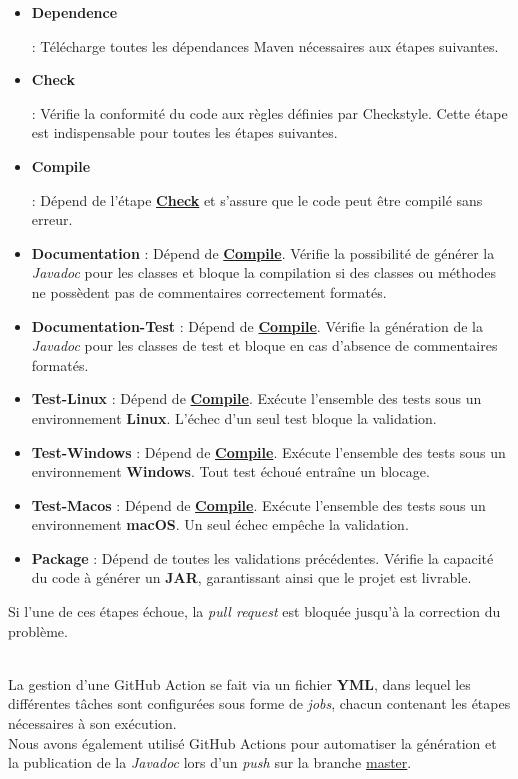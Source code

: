 \begin{itemize}
    \item \hypertarget{DependenceAction}{\textbf{Dependence}} : Télécharge toutes les dépendances Maven nécessaires aux étapes suivantes.
    \item \hypertarget{CheckAction}{\textbf{Check}} : Vérifie la conformité du code aux règles définies par Checkstyle. Cette étape est indispensable pour toutes les étapes suivantes.
    \item \hypertarget{CompileAction}{\textbf{Compile}} : Dépend de l'étape \hyperlink{CheckAction}{\textbf{Check}} et s'assure que le code peut être compilé sans erreur.
    \item \textbf{Documentation} : Dépend de \hyperlink{CompileAction}{\textbf{Compile}}. Vérifie la possibilité de générer la \emph{Javadoc} pour les classes et bloque la compilation si des classes ou méthodes ne possèdent pas de commentaires correctement formatés.
    \item \textbf{Documentation-Test} : Dépend de \hyperlink{CompileAction}{\textbf{Compile}}. Vérifie la génération de la \emph{Javadoc} pour les classes de test et bloque en cas d'absence de commentaires formatés.
    \item \textbf{Test-Linux} : Dépend de \hyperlink{CompileAction}{\textbf{Compile}}. Exécute l’ensemble des tests sous un environnement \textbf{Linux}. L'échec d’un seul test bloque la validation.
    \item \textbf{Test-Windows} : Dépend de \hyperlink{CompileAction}{\textbf{Compile}}. Exécute l’ensemble des tests sous un environnement \textbf{Windows}. Tout test échoué entraîne un blocage.
    \item \textbf{Test-Macos} : Dépend de \hyperlink{CompileAction}{\textbf{Compile}}. Exécute l’ensemble des tests sous un environnement \textbf{macOS}. Un seul échec empêche la validation.
    \item \textbf{Package} : Dépend de toutes les validations précédentes. Vérifie la capacité du code à générer un \textbf{JAR}, garantissant ainsi que le projet est livrable.
\end{itemize}

Si l'une de ces étapes échoue, la \emph{pull request} est bloquée jusqu'à la correction du problème.

\\
La gestion d'une GitHub Action se fait via un fichier \textbf{YML}, dans lequel les différentes tâches sont configurées sous forme de \emph{jobs}, chacun contenant les étapes nécessaires à son exécution.
\\
Nous avons également utilisé GitHub Actions pour automatiser la génération et la publication de la \emph{Javadoc} lors d'un \emph{push} sur la branche \href{https://github.com/Gr4-M3ACNL/hashi/tree/master}{master}.

